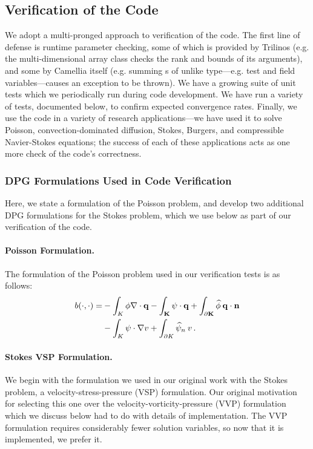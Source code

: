 \subsection{Verification of the Code}\label{sec:CamelliaVerification}
We adopt a multi-pronged approach to verification of the code.  The first line of defense is runtime parameter checking, some of which is provided by Trilinos (e.g. the  multi-dimensional array class checks the rank and bounds of its arguments), and some by Camellia itself (e.g. summing s of unlike type---e.g. test and field variables---causes an exception to be thrown).  We have a growing suite of unit tests which we periodically run during code development.  We have run a variety of tests, documented below, to confirm expected convergence rates.  Finally, we use the code in a variety of research applications---we have used it to solve Poisson, convection-dominated diffusion, Stokes, Burgers, and compressible Navier-Stokes equations; the success of each of these applications acts as one more check of the code's correctness.

\subsubsection{DPG Formulations Used in Code Verification}\label{NVR:sec:stokesForm}
Here, we state a formulation of the Poisson problem, and develop two additional DPG formulations for the Stokes problem, which we use below as part of our verification of the code.

\paragraph{Poisson Formulation.}  The formulation of the Poisson problem used in our verification tests is as follows:
\begin{align*}
b(\cdot,\cdot) = &- \int_K \phi \nabla \cdot \bf{q} - \int_K \psi \cdot \bf{q} + \int_{\partial K} \widehat{\phi} \: \bf{q} \cdot \bf{n}\\
&- \int_K \psi \cdot \nabla v + \int_{\partial K} \widehat{\psi}_n \: v \,.
\end{align*}

\paragraph{Stokes VSP Formulation.}
We begin with the formulation we used in our original work with the Stokes problem, a velocity-stress-pressure (VSP) formulation.  Our original motivation for selecting this one over the velocity-vorticity-pressure (VVP) formulation which we discuss below had to do with details of implementation.  The VVP formulation requires considerably fewer solution variables, so now that it is implemented, we prefer it.

